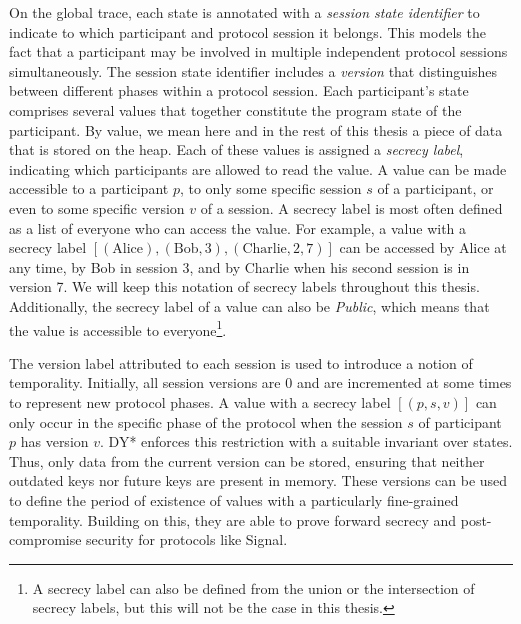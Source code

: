 On the global trace, each state is annotated with a \emph{session state identifier} to indicate to which participant and protocol session it belongs. This models the fact that a participant may be involved in multiple independent protocol sessions simultaneously. The session state identifier includes a \emph{version} that distinguishes between different phases within a protocol session.%
Each participant's state comprises several values that together constitute the program state of the participant.
By value, we mean here and in the rest of this thesis a piece of data that is stored on the heap.
Each of these values is assigned a \emph{secrecy label}, indicating which participants are allowed to read the value.
A value can be made accessible to a participant $p$, to only some specific session $s$ of a participant, or even to some specific version $v$ of a session.
A secrecy label is most often defined as a list of everyone who can access the value. For example, a value with a secrecy label $[(\text{Alice}), (\text{Bob}, 3), (\text{Charlie}, 2, 7)]$ can be accessed by Alice at any time, by Bob in session 3, and by Charlie when his second session is in version 7. We will keep this notation of secrecy labels throughout this thesis.
Additionally, the secrecy label of a value can also be \emph{Public}, which means that the value is accessible to everyone\footnote{A secrecy label can also be defined from the union or the intersection of secrecy labels, but this will not be the case in this thesis.}.

The version label attributed to each session is used to introduce a notion of temporality. Initially, all session versions are 0 and are incremented at some times to represent new protocol phases.
A value with a secrecy label $[(p,s,v)]$ can only occur in the specific phase of the protocol when the session $s$ of participant $p$ has version $v$.
DY* enforces this restriction with a suitable invariant over states. Thus, only data from the current version can be stored, ensuring that neither outdated keys nor future keys are present in memory.
These versions can be used to define the period of existence of values with a particularly fine-grained temporality.
Building on this, they are able to prove forward secrecy and post-compromise security for protocols like Signal.


